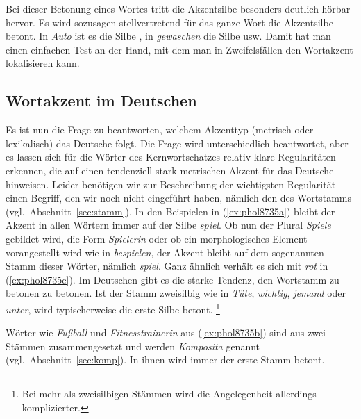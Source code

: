 Bei dieser Betonung eines Wortes tritt die Akzentsilbe besonders deutlich hörbar hervor.
Es wird sozusagen stellvertretend für das ganze Wort die Akzentsilbe betont.
In \textit{Auto} ist es die Silbe \textipa{[\t{aO}]}, in \textit{gewaschen} die Silbe \textipa{[vaS]} usw.
Damit hat man einen einfachen Test an der Hand, mit dem man in Zweifelsfällen den Wortakzent lokalisieren kann.

\subsection{Wortakzent im Deutschen}

\label{sec:deutscherwortakzent}

Es ist nun die Frage zu beantworten, welchem Akzenttyp (metrisch oder lexikalisch) das Deutsche folgt.
Die Frage wird unterschiedlich beantwortet, aber es lassen sich für die Wörter des Kernwortschatzes relativ klare Regularitäten erkennen, die auf einen tendenziell stark metrischen Akzent für das Deutsche hinweisen.
Leider benötigen wir zur Beschreibung der wichtigsten Regularität einen Begriff, den wir noch nicht eingeführt haben, nämlich den des \label{abs:3453457}Wortstamms (vgl.\ Abschnitt~\ref{sec:stamm}).
In den Beispielen in (\ref{ex:phol8735a}) bleibt der Akzent in allen Wörtern immer auf der Silbe \textit{spiel}.
Ob nun der Plural \textit{Spiele} gebildet wird, die Form \textit{Spielerin} oder ob ein morphologisches Element vorangestellt wird wie in \textit{bespielen}, der Akzent bleibt auf dem sogenannten Stamm dieser Wörter, nämlich \textit{spiel}.
Ganz ähnlich verhält es sich mit \textit{rot} in (\ref{ex:phol8735c}).
Im Deutschen gibt es die starke Tendenz, den Wortstamm zu betonen zu betonen.
Ist der Stamm zweisilbig wie in \textit{Tüte}, \textit{wichtig}, \textit{jemand} oder \textit{unter}, wird typischerweise die erste Silbe betont.%
\footnote{Bei mehr als zweisilbigen Stämmen wird die Angelegenheit allerdings komplizierter.}


Wörter wie \textit{Fußball} und \textit{Fitnesstrainerin} aus (\ref{ex:phol8735b}) sind aus zwei Stämmen zusammengesetzt und werden \textit{Komposita} genannt (vgl.\ Abschnitt~\ref{sec:komp}).
In ihnen wird immer der erste Stamm betont.


